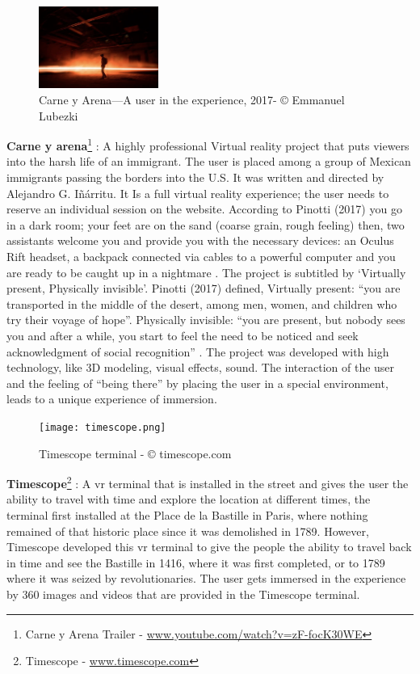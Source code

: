 \begin{figure}
    \centering
    \includegraphics[width=0.35\textwidth]{images/carne.png}
    \caption{Carne y Arena—A user in the experience, 2017- © Emmanuel Lubezki}
    \label{fig:carne}
\end{figure}

\textbf{Carne y arena}\footnote{Carne y Arena Trailer - \url{www.youtube.com/watch?v=zF-focK30WE}} : A highly professional
Virtual reality project that puts viewers
into the harsh life of an immigrant. The
user is placed among a group of
Mexican immigrants passing the
borders into the U.S. It was written and
directed by Alejandro G. Iñárritu. It Is a
full virtual reality experience; the user
needs to reserve an individual session
on the website. According to Pinotti (2017) you go in a dark room; your feet are on the sand (coarse grain, rough feeling) then, two assistants welcome you and provide you with the
necessary devices: an Oculus Rift headset, a backpack connected via cables to a powerful
computer and you are ready to be caught up in a nightmare \citep{Pinotti2017}. The project is
subtitled by ‘Virtually present, Physically invisible’. Pinotti (2017) defined, Virtually present:
“you are transported in the middle of the desert, among men, women, and children who try
their voyage of hope”. Physically invisible: “you are present, but nobody sees you and after a
while, you start to feel the need to be noticed and seek acknowledgment of social
recognition” \citep{Pinotti2017}. The project was developed with high technology, like 3D
modeling, visual effects, sound. The interaction of the user and the feeling of “being there”
by placing the user in a special environment, leads to a unique experience of immersion.


\begin{figure}
    \centering
    \texttt{[image: timescope.png]}
    \caption{Timescope terminal - © timescope.com }
    \label{fig:timescope}
\end{figure}
\textbf{Timescope}\footnote{Timescope - \url{www.timescope.com}} : A \acrshort{vr} terminal that is installed in the street and gives the user the ability to travel with time and explore the location at different times, the terminal first installed at the Place de la Bastille in Paris, where nothing remained of that historic place since it was demolished in 1789. However, Timescope developed this \acrshort{vr} terminal to give the people the ability to travel back in time and see the Bastille in 1416, where it was first completed, or to 1789 where it was seized by revolutionaries. The user gets immersed in the experience by 360 images and videos that are provided in the Timescope terminal.

